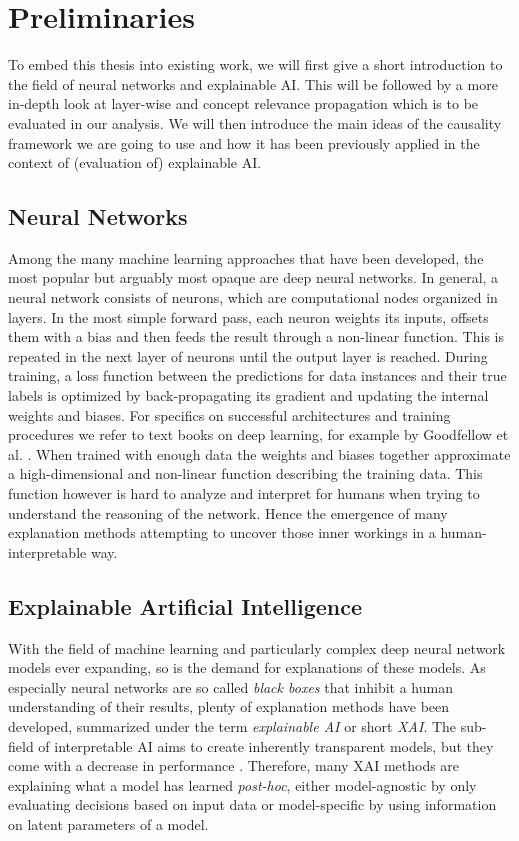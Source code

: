 \chapter{Preliminaries}\label{chapter:background}

To embed this thesis into existing work, we will first give a short introduction to the field of neural networks and explainable AI. This will be followed by a more in-depth look at layer-wise and concept relevance propagation which is to be evaluated in our analysis. We will then introduce the main ideas of the causality framework we are going to use and how it has been previously applied in the context of (evaluation of) explainable AI. 


\section{Neural Networks}
Among the many machine learning approaches that have been developed, the most popular but arguably most opaque are deep neural networks. In general, a neural network consists of neurons, which are computational nodes organized in layers. In the most simple forward pass, each neuron weights its inputs, offsets them with a bias and then feeds the result through a non-linear function. This is repeated in the next layer of neurons until the output layer is reached. During training, a loss function between the predictions for data instances and their true labels is optimized by back-propagating its gradient and updating the internal weights and biases. For specifics on successful architectures and training procedures we refer to text books on deep learning, for example by Goodfellow et al. \cite{Goodfellow2016}. When trained with enough data the weights and biases together approximate a high-dimensional and non-linear function describing the training data. This function however is hard to analyze and interpret for humans when trying to understand the reasoning of the network. Hence the emergence of many explanation methods attempting to uncover those inner workings in a human-interpretable way.


\section{Explainable Artificial Intelligence}
With the field of machine learning and particularly complex deep neural network models ever expanding, so is the demand for explanations of these models.
As especially neural networks are so called \textit{black boxes} that inhibit a human understanding of their results, plenty of explanation methods have been developed, summarized under the term \textit{explainable AI} or short \textit{XAI}. The sub-field of interpretable AI aims to create inherently transparent models, but they come with a decrease in performance \cite{Lipton2018}. Therefore, many XAI methods are explaining what a model has learned \textit{post-hoc}, either model-agnostic by only evaluating decisions based on input data or model-specific by using information on latent parameters of a model.



